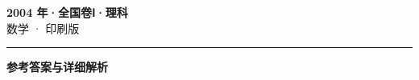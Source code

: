 \documentclass[zihao=5, a4paper]{ctexart}
\begin{document}
\begin{center}
  {\Large\bfseries 2004 年·全国卷Ⅰ·理科}\\[4pt]
  {\large 数学 · 印刷版}
\end{center}
\medskip
{}

\par\bigskip\hrule\bigskip
{}
\begin{center}{\large\bfseries 参考答案与详细解析}\end{center}
\smallskip

\end{document}
